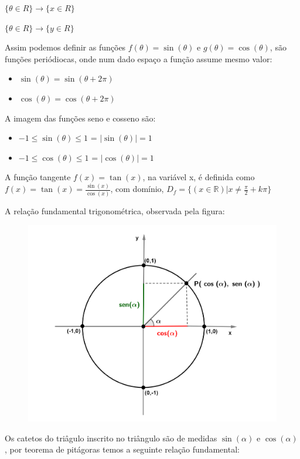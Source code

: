 \begin{multicols*}{2}
    $\{\theta \in R \} \rightarrow \{x \in R\}$
    
    $\{\theta \in R \} \rightarrow \{ y \in R\}$
    
    Assim podemos definir as funções $f(\theta) = \sin(\theta)$ e $g(\theta) = \cos(\theta)$, são funções periódiocas, onde num dado espaço a função assume mesmo valor:
    \begin{itemize}
    \item $\sin(\theta) = \sin(\theta  + 2 \pi)$
    \item $\cos(\theta) = \cos(\theta +  2 \pi)$
    \end{itemize}
    
    A imagem das funções seno e cosseno são:
    \begin{itemize}
    \item $-1 \le \sin(\theta) \le 1$ = $|\sin(\theta)| = 1$
    \item $-1 \le \cos(\theta) \le 1$ = $|\cos(\theta)| = 1$
    \end{itemize}
    
    A função tangente $f(x)  = \tan(x)$, na variável x, é definida como 
    $f(x) = \tan(x) = \frac{\sin(x)}{\cos(x)}$, com domínio, 
    $D_f = \{ (x \in \mathbb{R})| x \ne \frac{\pi}{2} + k \pi \}$
    
    A relação fundamental trigonométrica, observada pela figura:
    \begin{figure}[H]
        
        \includegraphics[scale=0.15]{assets/rafael/img32.png}
    \end{figure}
    Os catetos do triâgulo inscrito no triângulo são de medidas $\sin(\alpha)$ e $\cos(\alpha)$, por teorema de pitágoras temos a seguinte relação fundamental:
    

\end{multicols*}
